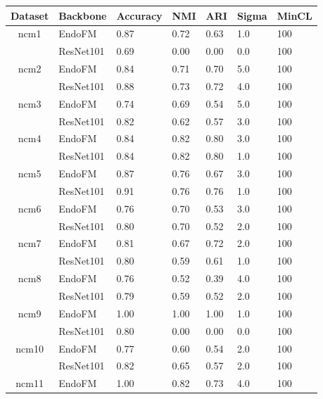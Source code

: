 \begin{table}[h]
\small
\setlength\tabcolsep{3pt}
    \centering
    \vspace{-0.05in}
    \begin{tabular}{cllllll}
    \toprule
        Dataset & Backbone & Accuracy & NMI & ARI & Sigma & MinCL \\
        \midrule
    \multirow{2}{*}{ncm1}
 & EndoFM & 0.87 & 0.72 & 0.63 & 1.0 & 100 \\
     & ResNet101 & 0.69 & 0.00 & 0.00 & 0.0 & 100 \\
    \midrule
    \multirow{2}{*}{ncm2}
 & EndoFM & 0.84 & 0.71 & 0.70 & 5.0 & 100 \\
     & ResNet101 & 0.88 & 0.73 & 0.72 & 4.0 & 100 \\
    \midrule
    \multirow{2}{*}{ncm3}
 & EndoFM & 0.74 & 0.69 & 0.54 & 5.0 & 100 \\
     & ResNet101 & 0.82 & 0.62 & 0.57 & 3.0 & 100 \\
    \midrule
    \multirow{2}{*}{ncm4}
 & EndoFM & 0.84 & 0.82 & 0.80 & 3.0 & 100 \\
     & ResNet101 & 0.84 & 0.82 & 0.80 & 1.0 & 100 \\
    \midrule
    \multirow{2}{*}{ncm5}
 & EndoFM & 0.87 & 0.76 & 0.67 & 3.0 & 100 \\
     & ResNet101 & 0.91 & 0.76 & 0.76 & 1.0 & 100 \\
    \midrule
    \multirow{2}{*}{ncm6}
 & EndoFM & 0.76 & 0.70 & 0.53 & 3.0 & 100 \\
     & ResNet101 & 0.80 & 0.70 & 0.52 & 2.0 & 100 \\
    \midrule
    \multirow{2}{*}{ncm7}
 & EndoFM & 0.81 & 0.67 & 0.72 & 2.0 & 100 \\
     & ResNet101 & 0.80 & 0.59 & 0.61 & 1.0 & 100 \\
    \midrule
    \multirow{2}{*}{ncm8}
 & EndoFM & 0.76 & 0.52 & 0.39 & 4.0 & 100 \\
     & ResNet101 & 0.79 & 0.59 & 0.52 & 2.0 & 100 \\
    \midrule
    \multirow{2}{*}{ncm9}
 & EndoFM & 1.00 & 1.00 & 1.00 & 1.0 & 100 \\
     & ResNet101 & 0.80 & 0.00 & 0.00 & 0.0 & 100 \\
    \midrule
    \multirow{2}{*}{ncm10}
 & EndoFM & 0.77 & 0.60 & 0.54 & 2.0 & 100 \\
     & ResNet101 & 0.82 & 0.65 & 0.57 & 2.0 & 100 \\
    \midrule
    \multirow{2}{*}{ncm11}
 & EndoFM & 1.00 & 0.82 & 0.73 & 4.0 & 100 \\

\end{tabular}
\end{table}
